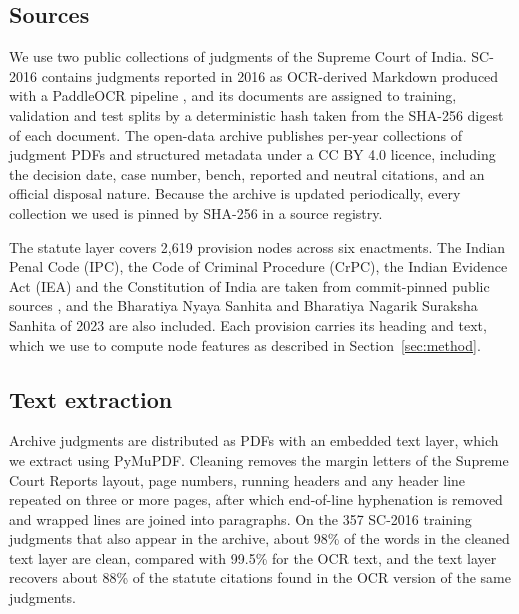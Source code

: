 \documentclass[11pt,a4paper]{article}
\begin{document}
\subsection{Sources}
We use two public collections of judgments of the Supreme Court of India. SC-2016 \cite{r29} contains judgments reported in 2016 as OCR-derived Markdown produced with a PaddleOCR pipeline \cite{r61}, and its documents are assigned to training, validation and test splits by a deterministic hash taken from the SHA-256 digest of each document. The open-data archive \cite{r30} publishes per-year collections of judgment PDFs and structured metadata under a CC BY 4.0 licence, including the decision date, case number, bench, reported and neutral citations, and an official disposal nature. Because the archive is updated periodically, every collection we used is pinned by SHA-256 in a source registry.

The statute layer covers 2,619 provision nodes across six enactments. The Indian Penal Code (IPC), the Code of Criminal Procedure (CrPC), the Indian Evidence Act (IEA) and the Constitution of India are taken from commit-pinned public sources \cite{r62}, and the Bharatiya Nyaya Sanhita and Bharatiya Nagarik Suraksha Sanhita of 2023 are also included. Each provision carries its heading and text, which we use to compute node features as described in Section~\ref{sec:method}.

\subsection{Text extraction}
Archive judgments are distributed as PDFs with an embedded text layer, which we extract using PyMuPDF. Cleaning removes the margin letters of the Supreme Court Reports layout, page numbers, running headers and any header line repeated on three or more pages, after which end-of-line hyphenation is removed and wrapped lines are joined into paragraphs. On the 357 SC-2016 training judgments that also appear in the archive, about 98\% of the words in the cleaned text layer are clean, compared with 99.5\% for the OCR text, and the text layer recovers about 88\% of the statute citations found in the OCR version of the same judgments.
\end{document}
